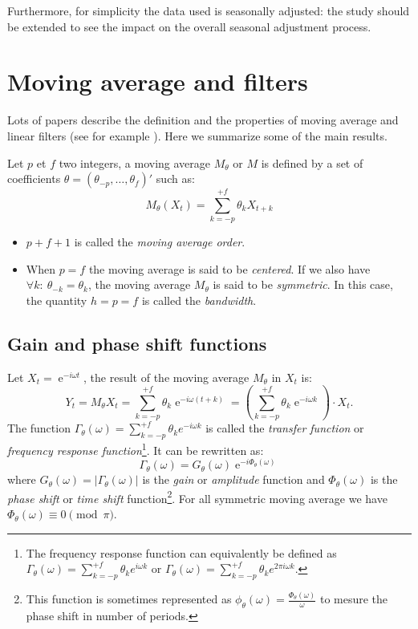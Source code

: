 \documentclass[
  12pt,
  ,
  a4paper]{article}
\DeclareMathOperator{\e}{e}
\newcommand\1{\mathds{1}}
\begin{document}
Furthermore, for simplicity the data used is seasonally adjusted: the study should be extended to see the impact on the overall seasonal adjustment process.

\hypertarget{sec:propMM}{%
\section{Moving average and filters}\label{sec:propMM}}

Lots of papers describe the definition and the properties of moving average and linear filters (see for example \textcite{ch12HBSA}).
Here we summarize some of the main results.

Let \(p\) et \(f\) two integers, a moving average \(M_\theta\) or \(M\) is defined by a set of coefficients \(\theta=(\theta_{-p},\dots,\theta_{f})'\) such as:
\[
M_\theta(X_t)=\sum_{k=-p}^{+f}\theta_kX_{t+k}
\]

\begin{itemize}
\item
  \(p+f+1\) is called the \emph{moving average order}.
\item
  When \(p=f\) the moving average is said to be \emph{centered}.
  If we also have \(\forall k:\:\theta_{-k} = \theta_k\), the moving average \(M_\theta\) is said to be \emph{symmetric}.
  In this case, the quantity \(h=p=f\) is called the \emph{bandwidth}.
\end{itemize}

\hypertarget{gain-and-phase-shift-functions}{%
\subsection{Gain and phase shift functions}\label{gain-and-phase-shift-functions}}

Let \(X_t=\e^{-i\omega t}\), the result of the moving average \(M_\theta\) in \(X_t\) is:
\[
Y_t = M_{\theta}X_t = \sum_{k=-p}^{+f} \theta_k \e^{-i \omega (t+k)}
= \left(\sum_{k=-p}^{+f} \theta_k \e^{-i \omega k}\right)\cdot X_t.
\]
The function \(\Gamma_\theta(\omega)=\sum_{k=-p}^{+f} \theta_k e^{-i \omega k}\) is called the \emph{transfer function} or \emph{frequency response function}\footnote{The frequency response function can equivalently be defined as \(\Gamma_\theta(\omega)=\sum_{k=-p}^{+f} \theta_k e^{i \omega k}\) or \(\Gamma_\theta(\omega)=\sum_{k=-p}^{+f} \theta_k e^{2\pi i \omega k}\).}.
It can be rewritten as:
\[
\Gamma_\theta(\omega) = G_\theta(\omega)\e^{-i\Phi_\theta(\omega)}
\]
where \(G_\theta(\omega)=\lvert\Gamma_\theta(\omega)\rvert\) is the \emph{gain} or \emph{amplitude} function and \(\Phi_\theta(\omega)\) is the \emph{phase shift} or \emph{time shift} function\footnote{This function is sometimes represented as \(\phi_\theta(\omega)=\frac{\Phi_\theta(\omega)}{\omega}\) to mesure the phase shift in number of periods.}.
For all symmetric moving average we have \(\Phi_\theta(\omega)\equiv 0 \pmod{\pi}\).
\end{document}
